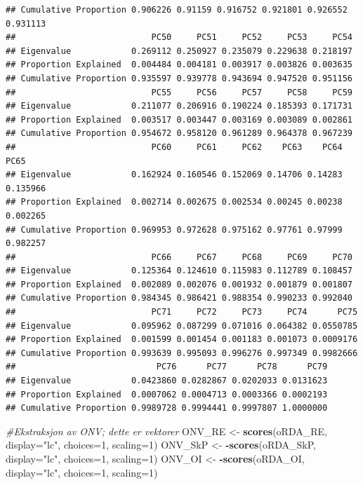 \documentclass[]{article}
\newenvironment{Shaded}{\begin{snugshade}}{\end{snugshade}}
\newcommand{\CommentTok}[1]{\textcolor[rgb]{0.56,0.35,0.01}{\textit{#1}}}
\newcommand{\DataTypeTok}[1]{\textcolor[rgb]{0.13,0.29,0.53}{#1}}
\newcommand{\DecValTok}[1]{\textcolor[rgb]{0.00,0.00,0.81}{#1}}
\newcommand{\KeywordTok}[1]{\textcolor[rgb]{0.13,0.29,0.53}{\textbf{#1}}}
\newcommand{\NormalTok}[1]{#1}
\newcommand{\OperatorTok}[1]{\textcolor[rgb]{0.81,0.36,0.00}{\textbf{#1}}}
\newcommand{\StringTok}[1]{\textcolor[rgb]{0.31,0.60,0.02}{#1}}
\begin{document}
\begin{verbatim}
## Cumulative Proportion 0.906226 0.91159 0.916752 0.921801 0.926552 0.931113
##                           PC50     PC51     PC52     PC53     PC54
## Eigenvalue            0.269112 0.250927 0.235079 0.229638 0.218197
## Proportion Explained  0.004484 0.004181 0.003917 0.003826 0.003635
## Cumulative Proportion 0.935597 0.939778 0.943694 0.947520 0.951156
##                           PC55     PC56     PC57     PC58     PC59
## Eigenvalue            0.211077 0.206916 0.190224 0.185393 0.171731
## Proportion Explained  0.003517 0.003447 0.003169 0.003089 0.002861
## Cumulative Proportion 0.954672 0.958120 0.961289 0.964378 0.967239
##                           PC60     PC61     PC62    PC63    PC64     PC65
## Eigenvalue            0.162924 0.160546 0.152069 0.14706 0.14283 0.135966
## Proportion Explained  0.002714 0.002675 0.002534 0.00245 0.00238 0.002265
## Cumulative Proportion 0.969953 0.972628 0.975162 0.97761 0.97999 0.982257
##                           PC66     PC67     PC68     PC69     PC70
## Eigenvalue            0.125364 0.124610 0.115983 0.112789 0.108457
## Proportion Explained  0.002089 0.002076 0.001932 0.001879 0.001807
## Cumulative Proportion 0.984345 0.986421 0.988354 0.990233 0.992040
##                           PC71     PC72     PC73     PC74      PC75
## Eigenvalue            0.095962 0.087299 0.071016 0.064382 0.0550785
## Proportion Explained  0.001599 0.001454 0.001183 0.001073 0.0009176
## Cumulative Proportion 0.993639 0.995093 0.996276 0.997349 0.9982666
##                            PC76      PC77      PC78      PC79
## Eigenvalue            0.0423860 0.0282867 0.0202033 0.0131623
## Proportion Explained  0.0007062 0.0004713 0.0003366 0.0002193
## Cumulative Proportion 0.9989728 0.9994441 0.9997807 1.0000000
\end{verbatim}

\begin{Shaded}
\begin{Highlighting}[]
\CommentTok{#Ekstraksjon av ONV; dette er vektorer}
\NormalTok{ONV_RE <-}\StringTok{ }\KeywordTok{scores}\NormalTok{(oRDA_RE, }\DataTypeTok{display=}\StringTok{"lc"}\NormalTok{, }\DataTypeTok{choices=}\DecValTok{1}\NormalTok{, }\DataTypeTok{scaling=}\DecValTok{1}\NormalTok{)}
\NormalTok{ONV_SkP <-}\StringTok{ }\OperatorTok{-}\KeywordTok{scores}\NormalTok{(oRDA_SkP, }\DataTypeTok{display=}\StringTok{"lc"}\NormalTok{, }\DataTypeTok{choices=}\DecValTok{1}\NormalTok{, }\DataTypeTok{scaling=}\DecValTok{1}\NormalTok{)}
\NormalTok{ONV_OI <-}\StringTok{ }\OperatorTok{-}\KeywordTok{scores}\NormalTok{(oRDA_OI, }\DataTypeTok{display=}\StringTok{"lc"}\NormalTok{, }\DataTypeTok{choices=}\DecValTok{1}\NormalTok{, }\DataTypeTok{scaling=}\DecValTok{1}\NormalTok{)}
\end{Highlighting}
\end{Shaded}
\end{document}
